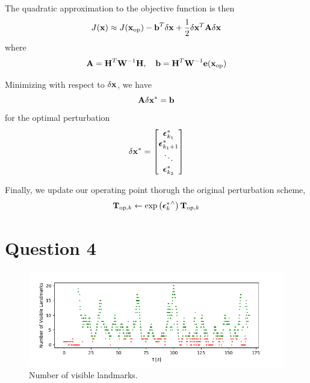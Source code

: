 \documentclass[a4paper]{article}
\begin{document}
The quadratic approximation to the objective function is then
\begin{equation}
    J(\bm{\mathbf{x}}) \approx J(\bm{\mathbf{x}}_{\text{op}}) - \bm{\mathbf{b}}^T \delta \bm{\mathbf{x}} + \dfrac{1}{2} \delta \bm{\mathbf{x}}^T \bm{\mathbf{A}} \delta \bm{\mathbf{x}}
\end{equation}
where
\begin{equation}
    \bm{\mathbf{A}} = \bm{\mathbf{H}}^T \bm{\mathbf{W}}^{-1}\bm{\mathbf{H}}, \quad \bm{\mathbf{b}} = \bm{\mathbf{H}}^T \bm{\mathbf{W}}^{-1} \bm{\mathbf{e}}(\bm{\mathbf{x}}_{\text{op}})
\end{equation}

Minimizing with respect to $\delta \bm{\mathbf{x}}$, we have 
\begin{equation}
    \bm{\mathbf{A}} \delta \bm{\mathbf{x}}^* = \bm{\mathbf{b}}
\end{equation}
for the optimal perturbation
\begin{equation}
    \delta \bm{\mathbf{x}}^* = \begin{bmatrix}
      \bm{\mathbf{\epsilon}}_{k_1}^* \\ \bm{\mathbf{\epsilon}}_{k_1+1}^* \\ \ddots \\ \bm{\mathbf{\epsilon}}_{k_2}^*
    \end{bmatrix}
\end{equation}

Finally, we update our operating point thorugh the original perturbation scheme,
\begin{equation}
    \bm{\mathbf{T}}_{\text{op}, k} \leftarrow \exp\left( {\bm{\mathbf{\epsilon}}_k^*}^{\wedge} \right) \bm{\mathbf{T}}_{\text{op}, k}
\end{equation}

\section*{Question 4}

\begin{figure}[H]
    \centering
    \includegraphics[width=\textwidth]{code/num_visible.png}
    \caption{Number of visible landmarks.}
    \label{fig:4}
\end{figure}
\end{document}
